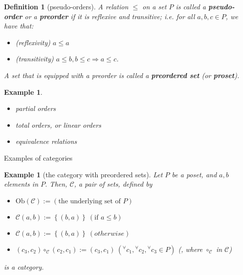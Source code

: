 \documentclass[dvipdfmx,10pt,notheorems]{beamer}
\newtheorem{definition}[theorem]{Definition}
\newtheorem{example}[theorem]{Example}
\renewcommand{\#}{^\sharp}
\begin{document}
	\begin{frame}
			\begin{definition}[pseudo-orders]
					A relation $\leq$ on a set $P$ is called a {\bf pseudo-order} or a {\bf preorder} if
					it is reflexive and transitive; i.e. for all $a,b,c\in P$, we have that:
							\begin{itemize}
									\item (reflexivity) $a\leq a$
									\item (transitivity) $a\leq b, b\leq c \Rightarrow a\leq c$.
							\end{itemize}
					A set that is equipped with a preorder is called a {\bf preordered set} (or {\bf proset}).
			\end{definition}
			\begin{example}
					\begin{itemize}
							\item partial orders
							\item total orders, or linear orders
							\item equivalence relations
					\end{itemize}
			\end{example}
	\end{frame}



	\begin{frame}{Examples of categories}
			\begin{example}[the category with preordered sets]
					Let $P$ be a poset, and $a,b$ elements in $P$. Then,
					$\mathcal{C}$, a pair of sets, defined by
							\begin{itemize}
									\item $\mathrm{Ob}(\mathcal{C}):=(\mbox{the underlying set of }P)$
									\item $\mathcal{C}(a,b):=\left\{(b,a)\right\}~(\mbox{if }a\leq b)$
									\item $\mathcal{C}(a,b):=\left\{(b,a)\right\}~(otherwise)$
									\item $(c_3,c_2)\circ_{\mathcal{C}}(c_2,c_1):=(c_3,c_1)~
									({}^\forall c_1,{}^\forall c_2, {}^\forall c_3\in P)$
									(, where $\circ_\mathcal{C}$ in $\mathcal{C}$)
							\end{itemize}
					is a category.
			\end{example}
	\end{frame}
	
	
	
\end{document}
